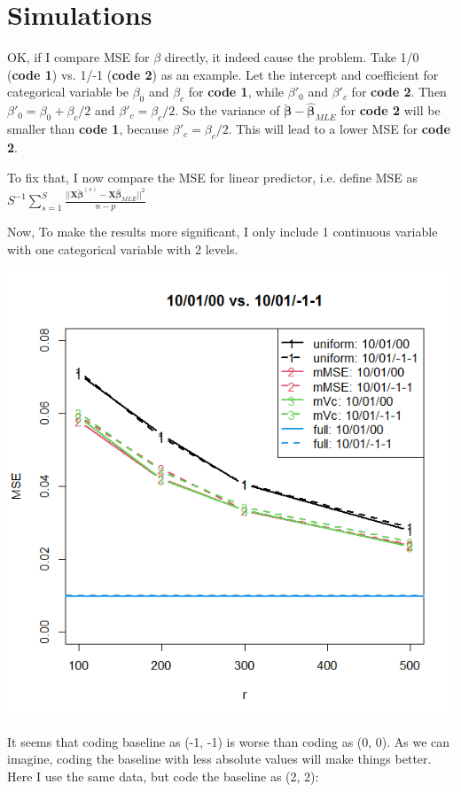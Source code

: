\documentclass[]{article}
\begin{document}
\section{Simulations}
OK, if I compare MSE for $\beta$ directly, it indeed cause the problem. Take 1/0 (\textbf{code 1}) vs. 1/-1 (\textbf{code 2}) as an example. Let the intercept and coefficient for categorical variable be $\beta_0$ and $\beta_c$ for \textbf{code 1}, while  $\beta'_0$ and $\beta'_c$ for \textbf{code 2}. Then $\beta'_0 = \beta_0 + \beta_c/2$ and $\beta'_c = \beta_c/2$. So the variance of $\boldsymbol{\breve{\beta}} - \hat{\boldsymbol{\beta}}_{MLE}$ for \textbf{code 2} will be smaller than \textbf{code 1}, because $\beta'_c = \beta_c/2$. This will lead to a lower MSE for \textbf{code 2}.

To fix that, I now compare the MSE for linear predictor, i.e. define MSE as $S^{-1}\sum_{s=1}^{S}\frac{||\boldsymbol{X}\breve{\boldsymbol{\beta}}^{(s)} - \boldsymbol{X}\hat{\boldsymbol{\beta}}_{MLE}||^2}{n - p}$

Now, To make the results more significant, I only include 1 continuous variable with one categorical variable with 2 levels. 

\includegraphics[width = .8\textwidth]{plot_2levels.png}

It seems that coding baseline as (-1, -1) is worse than coding as (0, 0). As we can imagine, coding the baseline with less absolute values will make things better. Here I use the same data, but code the baseline as (2, 2):
\end{document}
